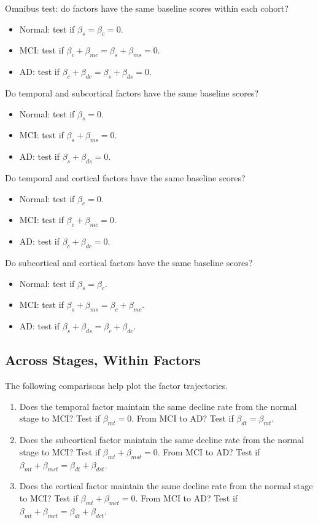 \documentclass{article}
\begin{document}
Omnibus test: do factors have the same baseline scores within each cohort?
\begin{itemize}
\item Normal: test if $\beta_s=\beta_c=0$.
\item MCI: test if $\beta_c+\beta_{mc}=\beta_s+\beta_{ms}=0$.
\item AD: test if $\beta_c+\beta_{dc}=\beta_s+\beta_{ds}=0$.
\end{itemize}

Do temporal and subcortical factors have the same baseline scores?
\begin{itemize}
\item Normal: test if $\beta_s=0$.
\item MCI: test if $\beta_s+\beta_{ms}=0$.
\item AD: test if $\beta_s+\beta_{ds}=0$.
\end{itemize}

Do temporal and cortical factors have the same baseline scores?
\begin{itemize}
\item Normal: test if $\beta_c=0$.
\item MCI: test if $\beta_c+\beta_{mc}=0$.
\item AD: test if $\beta_c+\beta_{dc}=0$.
\end{itemize}

Do subcortical and cortical factors have the same baseline scores?
\begin{itemize}
\item Normal: test if $\beta_s=\beta_c$.
\item MCI: test if $\beta_s+\beta_{ms}=\beta_c+\beta_{mc}$.
\item AD: test if $\beta_s+\beta_{ds}=\beta_c+\beta_{dc}$.
\end{itemize}

\subsection{Across Stages, Within Factors}

The following comparisons help plot the factor trajectories.

\begin{enumerate}
\item Does the temporal factor maintain the same decline rate from the normal stage to MCI? Test if $\beta_{mt}=0$. From MCI to AD? Test if $\beta_{dt}=\beta_{mt}$.
\item Does the subcortical factor maintain the same decline rate from the normal stage to MCI? Test if $\beta_{mt}+\beta_{mst}=0$. From MCI to AD? Test if $\beta_{mt}+\beta_{mst}=\beta_{dt}+\beta_{dst}$.
\item Does the cortical factor maintain the same decline rate from the normal stage to MCI? Test if $\beta_{mt}+\beta_{mct}=0$. From MCI to AD? Test if $\beta_{mt}+\beta_{mct}=\beta_{dt}+\beta_{dct}$.
\end{enumerate}
\end{document}
